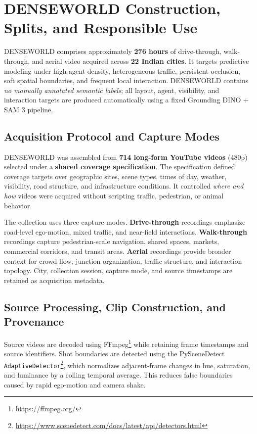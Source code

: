 \section{DENSEWORLD Construction, Splits, and Responsible Use}
\label{app:dataset}

DENSEWORLD comprises approximately \textbf{276 hours} of
drive-through, walk-through, and aerial video acquired across
\textbf{22 Indian cities}. It targets predictive modeling under high
agent density, heterogeneous traffic, persistent occlusion, soft spatial
boundaries, and frequent local interaction. DENSEWORLD contains
\emph{no manually annotated semantic labels}; all layout, agent,
visibility, and interaction targets are produced automatically using a
fixed Grounding DINO + SAM 3 pipeline.

\subsection{Acquisition Protocol and Capture Modes}
\label{app:dataset_acquisition}

DENSEWORLD was assembled from \textbf{714 long-form YouTube videos} (480p)
selected under a \textbf{shared coverage specification}.
The specification defined coverage targets over geographic sites,
scene types, times of day, weather, visibility, road structure, and
infrastructure conditions. It controlled \emph{where and how} videos
were acquired without scripting traffic, pedestrian, or animal
behavior.

The collection uses three capture modes. \textbf{Drive-through}
recordings emphasize road-level ego-motion, mixed traffic, and
near-field interactions. \textbf{Walk-through} recordings capture
pedestrian-scale navigation, shared spaces, markets, commercial
corridors, and transit areas. \textbf{Aerial} recordings provide broader
context for crowd flow, junction organization, traffic structure, and
interaction topology. City, collection session, capture mode, and
source timestamps are retained as acquisition metadata.

\subsection{Source Processing, Clip Construction, and Provenance}
\label{app:clip_construction}

Source videos are decoded using
FFmpeg\footnote{\url{https://ffmpeg.org/}} while retaining frame
timestamps and source identifiers. Shot boundaries are detected using
the PySceneDetect
\texttt{AdaptiveDetector}\footnote{\url{https://www.scenedetect.com/docs/latest/api/detectors.html}},
which normalizes adjacent-frame changes in hue, saturation, and
luminance by a rolling temporal average. This reduces false boundaries
caused by rapid ego-motion and camera shake.

